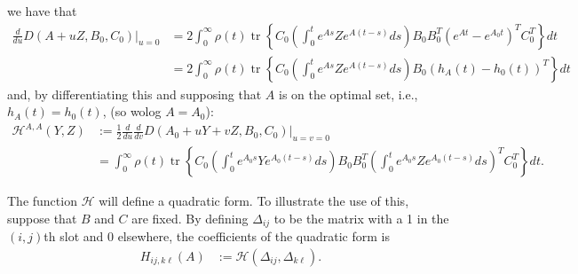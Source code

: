\documentclass{article}
\newcommand{\tr}{\mathop{\mbox{tr}}} %
\newcommand{\calH}{\mathcal{H}}
\newcommand{\1}{\mathbbm{1}}
\begin{document}
we have that
\begin{equation}
  \begin{aligned}
      \frac{d}{du} D(A+uZ,B_0,C_0)\vert_{u=0}
      &=
        2 \int_0^\infty \rho(t) \tr\left\{ C_0 \left( \int_0^t e^{As} Z e^{A(t-s)} ds \right) B_0 B_0^T \left( e^{At} - e^{A_0 t} \right)^T C_0^T \right\} dt \\
      &=
        2 \int_0^\infty \rho(t) \tr\left\{ C_0 \left( \int_0^t e^{As} Z e^{A(t-s)} ds \right) B_0 \left( h_A(t) - h_0(t) \right)^T \right\} dt 
  \end{aligned}
\end{equation}
and, by differentiating this and supposing that $A$ is on the optimal set,
i.e., $h_A(t)=h_0(t)$, (so wolog $A=A_0$):
\begin{equation}
  \begin{aligned}
      \calH^{A,A}(Y,Z) 
      &:= 
      \frac{1}{2} \frac{d}{du} \frac{d}{dv} D(A_0+uY+vZ,B_0,C_0)\vert_{u=v=0} \\
      &=
        \int_0^\infty \rho(t) \tr\left\{ C_0 
        \left( \int_0^t e^{A_0 s} Y e^{A_0 (t-s)} ds \right) 
        B_0 B_0^T 
        \left( \int_0^t e^{A_0 s} Z e^{A_0 (t-s)} ds \right)^T
        C_0^T \right\} dt  .
  \end{aligned}
\end{equation}

The function $\calH$ will define a quadratic form.
To illustrate the use of this, suppose that $B$ and $C$ are fixed.
By defining $\Delta_{ij}$ to be the matrix with a 1 in the $(i,j)$th slot
and 0 elsewhere,
the coefficients of the quadratic form is
\begin{equation}
    \begin{aligned}
        H_{ij, k\ell}(A)
        &:=
        \calH(\Delta_{ij}, \Delta_{k\ell}) .
    \end{aligned}
\end{equation}
\end{document}
